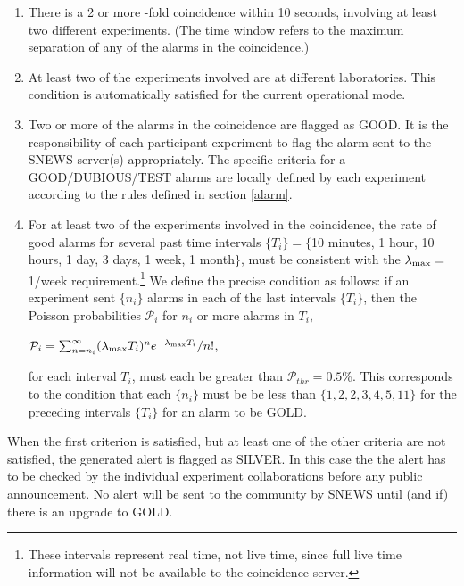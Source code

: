 \documentclass{article}
\begin{document}
\begin{enumerate}

\item There is a 2 or more -fold coincidence within 10 seconds,
involving at least two different experiments. 
(The time window refers to the maximum
separation of any of the alarms in the coincidence.)

\item At least two of the experiments involved
are at different laboratories.  This condition is automatically
satisfied for the current operational mode.

\item Two or more of the alarms in the coincidence
are flagged as GOOD.  It is the responsibility of each participant
experiment to flag the alarm sent to the SNEWS server(s)
appropriately. The specific criteria for a GOOD/DUBIOUS/TEST alarms
are locally defined by each experiment according to the rules defined
in section \ref{alarm}.
  
 \item For at least two of the experiments involved in the
 coincidence, the rate of good alarms for several past time intervals
 $\{T_i\}=\{$10 minutes, 1 hour, 10 hours, 1 day, 3 days, 1 week, 1
 month$\}$, must be consistent with the $\lambda_{\rm{max}}=$1/week
 requirement.\footnote{These intervals represent real time, not live
 time, since full live time information will not be available to the
 coincidence server.}  We define the precise condition as follows: if
 an experiment sent $\{n_i\}$ alarms in each of the last intervals
 $\{T_i\}$, then the Poisson probabilities $\mathcal{P}_i$ for $n_i$
 or more alarms in $T_i$,

$\mathcal{P}_i=\sum_{n=n_i}^{\infty}(\lambda_{\rm{max}} T_i)^{n}e^{-\lambda_{\rm{max}} T_i}/n!$,

for each interval $T_i$, must each be greater than $\mathcal{P}_{thr}=0.5$\%.
This corresponds to the condition that each $\{n_i\}$ must be be less
than $\{1,2,2,3,4,5,11\}$ for the preceding intervals $\{T_i\}$ for an
alarm to be GOLD.

\end{enumerate}

When the first criterion is satisfied, but at least one of the other
criteria are not satisfied, the generated alert is flagged as SILVER.
In this case the the alert has to be checked by the individual
experiment collaborations before any public announcement. No alert
will be sent to the community by SNEWS until (and if) there is an
upgrade to GOLD.
\end{document}
